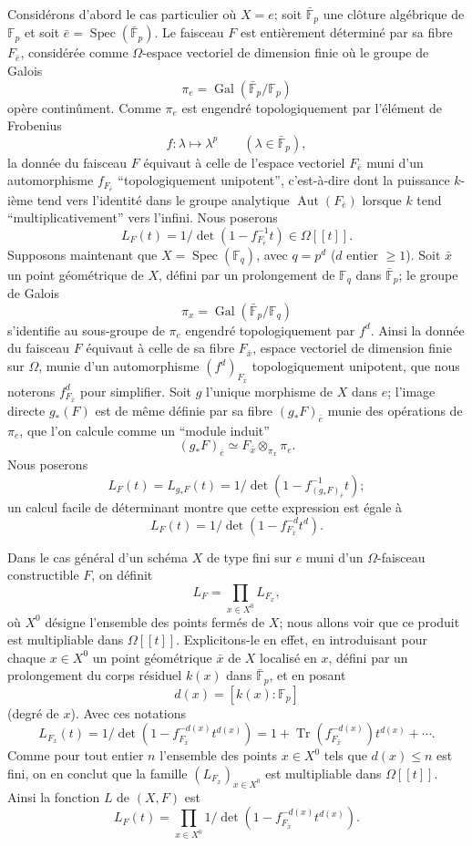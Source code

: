 \documentclass[11pt]{article}
\DeclareMathOperator{\Spec}{Spec}
\providecommand{\Gal}{\operatorname{Gal}}
\providecommand{\Tr}{\operatorname{Tr}}
\providecommand{\Tr}{\operatorname{Tr}}
\providecommand{\Tr}{\operatorname{Tr}}
\providecommand{\Aut}{\operatorname{Aut}}
\providecommand{\Tr}{\operatorname{Tr}}
\providecommand{\Spec}{\operatorname{Spec}}
\providecommand{\Spec}{\operatorname{Spec}}
\providecommand{\Aut}{\operatorname{Aut}}
\providecommand{\Spec}{\operatorname{Spec}}
\providecommand{\Tr}{\operatorname{Tr}}
\providecommand{\Spec}{\operatorname{Spec}}
\providecommand{\Gal}{\operatorname{Gal}}
\begin{document}
Considérons d'abord le cas particulier où $X=e$; soit $\bar{\mathbb F}_p$ une clôture algébrique de $\mathbb F_p$ et soit $\bar e=\Spec(\bar{\mathbb F}_p)$. Le faisceau $F$ est entièrement déterminé par sa fibre $F_{\bar e}$, considérée comme $\Omega$-espace vectoriel de dimension finie où le groupe de Galois
\[
\pi_e=\Gal(\bar{\mathbb F}_p/\mathbb F_p)
\]
opère continûment. Comme $\pi_e$ est engendré topologiquement par l'élément de Frobenius
\[
f: \lambda\longmapsto \lambda^p\qquad(\lambda\in\bar{\mathbb F}_p),
\]
la donnée du faisceau $F$ équivaut à celle de l'espace vectoriel $F_{\bar e}$ muni d'un automorphisme $f_{F_{\bar e}}$ ``topologiquement unipotent'', c'est-à-dire dont la puissance $k$-ième tend vers l'identité dans le groupe analytique $\Aut(F_{\bar e})$ lorsque $k$ tend ``multiplicativement'' vers l'infini. Nous poserons
\[
L_F(t)=1/\det(1-f_{F_{\bar e}}^{-1}t)\in\Omega[[t]].
\]
Supposons maintenant que $X=\Spec(\mathbb F_q)$, avec $q=p^d$ ($d$ entier $\ge1$). Soit $\bar x$ un point géométrique de $X$, défini par un prolongement de $\mathbb F_q$ dans $\bar{\mathbb F}_p$; le groupe de Galois
\[
\pi_x=\Gal(\bar{\mathbb F}_p/\mathbb F_q)
\]
s'identifie au sous-groupe de $\pi_e$ engendré topologiquement par $f^d$. Ainsi la donnée du faisceau $F$ équivaut à celle de sa fibre $F_{\bar x}$, espace vectoriel de dimension finie sur $\Omega$, munie d'un automorphisme $(f^d)_{F_{\bar x}}$ topologiquement unipotent, que nous noterons $f^d_{F_{\bar x}}$ pour simplifier. Soit $g$ l'unique morphisme de $X$ dans $e$; l'image directe $g_*(F)$ est de même définie par sa fibre $(g_*F)_{\bar e}$ munie des opérations de $\pi_e$, que l'on calcule comme un ``module induit''
\[
(g_*F)_{\bar e}\simeq F_{\bar x}\otimes_{\pi_x}\pi_e.
\]
Nous poserons
\[
L_F(t)=L_{g_*F}(t)=1/\det(1-f^{-1}_{(g_*F)_{\bar e}}t);
\]
un calcul facile de déterminant montre que cette expression est égale à
\[
L_F(t)=1/\det(1-f^{-d}_{F_{\bar x}}t^d).
\]

Dans le cas général d'un schéma $X$ de type fini sur $e$ muni d'un $\Omega$-faisceau constructible $F$, on définit
\[
L_F=\prod_{x\in X^0}L_{F_x},
\]
où $X^0$ désigne l'ensemble des points fermés de $X$; nous allons voir que ce produit est multipliable dans $\Omega[[t]]$. Explicitons-le en effet, en introduisant pour chaque $x\in X^0$ un point géométrique $\bar x$ de $X$ localisé en $x$, défini par un prolongement du corps résiduel $k(x)$ dans $\bar{\mathbb F}_p$, et en posant
\[
d(x)=[k(x):\mathbb F_p]
\]
(degré de $x$). Avec ces notations
\[
L_{F_x}(t)=1/\det(1-f_{F_{\bar x}}^{-d(x)}t^{d(x)})
 =1+\Tr(f_{F_{\bar x}}^{-d(x)})t^{d(x)}+\cdots .
\]
Comme pour tout entier $n$ l'ensemble des points $x\in X^0$ tels que $d(x)\le n$ est fini, on en conclut que la famille $(L_{F_x})_{x\in X^0}$ est multipliable dans $\Omega[[t]]$. Ainsi la fonction $L$ de $(X,F)$ est
\[
L_F(t)=\prod_{x\in X^0}1/\det(1-f_{F_{\bar x}}^{-d(x)}t^{d(x)}).
\]
\end{document}
